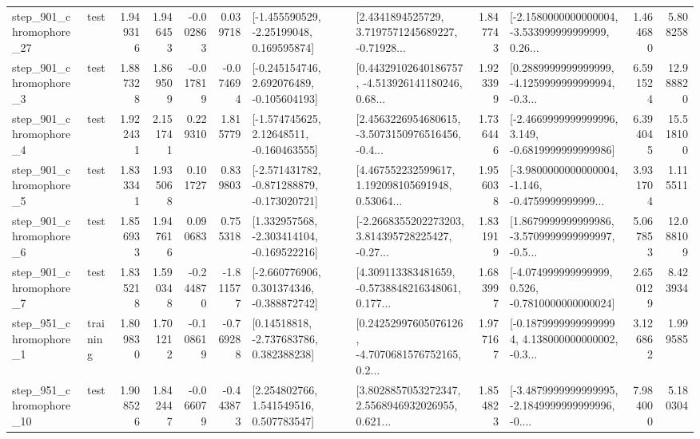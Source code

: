 \begin{tabular}{llrrrrllrlrr}
  step\_901\_chromophore\_27 &      test &      1.949316 &    1.946453 &     -0.002863 &  0.039718 &    [-1.455590529, -2.25199048, 0.169595874] &  [2.4341894525729, 3.7197571245689227, -0.71928... &       1.847743 &  [-2.1580000000000004, -3.533999999999999, 0.26... &            1.464680 &          5.808258 \\
   step\_901\_chromophore\_3 &      test &      1.887328 &    1.869509 &     -0.017819 & -0.074694 &   [-0.245154746, 2.692076489, -0.105604193] &  [0.44329102640186757, -4.513926141180246, 0.68... &       1.923399 &  [0.2889999999999999, -4.1259999999999994, -0.3... &            6.591524 &         12.988820 \\
   step\_901\_chromophore\_4 &      test &      1.922431 &    2.151741 &      0.229310 &  1.815779 &    [-1.574745625, 2.12648511, -0.160463555] &  [2.4563226954680615, -3.5073150976516456, -0.4... &       1.736446 &  [-2.4669999999999996, 3.149, -0.6819999999999986] &            6.394045 &         15.518100 \\
   step\_901\_chromophore\_5 &      test &      1.833341 &    1.935068 &      0.101727 &  0.839803 &  [-2.571431782, -0.871288879, -0.173020721] &  [4.467552232599617, 1.192098105691948, 0.53064... &       1.956038 &  [-3.9800000000000004, -1.146, -0.4759999999999... &            3.931704 &          1.115511 \\
   step\_901\_chromophore\_6 &      test &      1.856933 &    1.947616 &      0.090683 &  0.755318 &   [1.332957568, -2.303414104, -0.169522216] &  [-2.2668355202273203, 3.814395728225427, -0.27... &       1.831919 &  [1.8679999999999986, -3.5709999999999997, -0.5... &            5.067853 &         12.088109 \\
   step\_901\_chromophore\_7 &      test &      1.835218 &    1.590348 &     -0.244870 & -1.811577 &   [-2.660776906, 0.301374346, -0.388872742] &  [4.309113383481659, -0.5738848216348061, 0.177... &       1.683997 &   [-4.074999999999999, 0.526, -0.7810000000000024] &            2.650129 &          8.423934 \\
   step\_951\_chromophore\_1 &  training &      1.809830 &    1.701212 &     -0.108619 & -0.769288 &     [0.14518818, -2.737683786, 0.382388238] &  [0.24252997605076126, -4.7070681576752165, 0.2... &       1.977167 &  [-0.18799999999999994, 4.138000000000002, -0.3... &            3.126862 &          1.999585 \\
  step\_951\_chromophore\_10 &      test &      1.908526 &    1.842447 &     -0.066079 & -0.443873 &     [2.254802766, 1.541549516, 0.507783547] &  [3.8028857053272347, 2.5568946932026955, 0.621... &       1.854823 &  [-3.4879999999999995, -2.1849999999999996, -0.... &            7.984000 &          5.180304 \\

\end{tabular}
